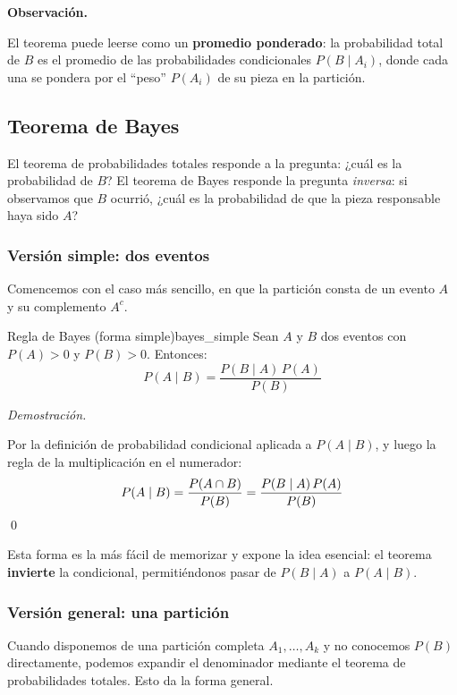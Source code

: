 \documentclass[12pt, a4paper]{book}
\newenvironment{observacion}{%
    \par\medskip\noindent\textbf{\color{azul}Observaci\'{o}n.}\enspace\itshape
}{\par\medskip}
\renewenvironment{proof}{%
    \par\medskip\noindent\textit{Demostraci\'{o}n.}\enspace
}{\qed\par\medskip}
\numberwithin{equation}{chapter}
\begin{document}
\begin{observacion}
	El teorema puede leerse como un \textbf{promedio ponderado}: la 
	probabilidad total de $B$ es el promedio de las probabilidades 
	condicionales $P(B \mid A_i)$, donde cada una se pondera por el 
	``peso'' $P(A_i)$ de su pieza en la partición.
\end{observacion}

\subsection{Teorema de Bayes}

El teorema de probabilidades totales responde a la pregunta: ¿cuál es 
la probabilidad de $B$? El teorema de Bayes responde la pregunta 
\textit{inversa}: si observamos que $B$ ocurrió, ¿cuál es la 
probabilidad de que la pieza responsable haya sido $A$?

\subsubsection*{Versión simple: dos eventos}

Comencemos con el caso más sencillo, en que la partición consta de un 
evento $A$ y su complemento $A^c$.

\begin{teorema}{Regla de Bayes (forma simple)}{bayes_simple}
	Sean $A$ y $B$ dos eventos con $P(A) > 0$ y $P(B) > 0$. Entonces:
	\[
	P(A \mid B) = \frac{P(B \mid A)\, P(A)}{P(B)}
	\]
\end{teorema}

\begin{proof}
	Por la definición de probabilidad condicional aplicada a 
	$P(A \mid B)$, y luego la regla de la multiplicación en el numerador:
	\[
	P(A \mid B) = \frac{P(A \cap B)}{P(B)} = 
	\frac{P(B \mid A)\, P(A)}{P(B)} \qedhere
	\]
\end{proof}

Esta forma es la más fácil de memorizar y expone la idea esencial: el 
teorema \textbf{invierte} la condicional, permitiéndonos pasar de 
$P(B \mid A)$ a $P(A \mid B)$.

\subsubsection*{Versión general: una partición}

Cuando disponemos de una partición completa $A_1, \ldots, A_k$ y no 
conocemos $P(B)$ directamente, podemos expandir el denominador mediante 
el teorema de probabilidades totales. Esto da la forma general.
\end{document}
